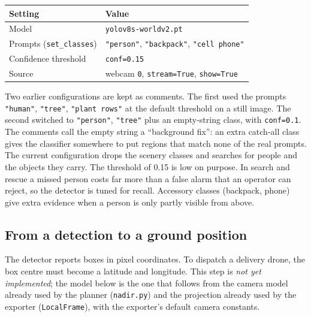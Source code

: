 \documentclass[11pt,a4paper]{article}
\newcommand{\code}[1]{\texttt{#1}}
\begin{document}
\begin{center}
\begin{tabular}{@{}ll@{}}
\toprule
Setting & Value \\
\midrule
Model & \code{yolov8s-worldv2.pt} \\
Prompts (\code{set\_classes}) & \code{"person"}, \code{"backpack"}, \code{"cell phone"} \\
Confidence threshold & \code{conf=0.15} \\
Source & webcam \code{0}, \code{stream=True}, \code{show=True} \\
\bottomrule
\end{tabular}
\end{center}

Two earlier configurations are kept as comments. The first used the prompts \code{"human"}, \code{"tree"},
\code{"plant rows"} at the default threshold on a still image. The second switched to \code{"person"},
\code{"tree"} plus an empty-string class, with \code{conf=0.1}. The comments call the empty string a
``background fix'': an extra catch-all class gives the classifier somewhere to put regions that match
none of the real prompts. The current configuration drops the scenery classes and searches for people and
the objects they carry. The threshold of 0.15 is low on purpose. In search and
rescue a missed person costs far more than a false alarm that an operator can reject, so the detector is
tuned for recall. Accessory classes (backpack, phone) give extra evidence when a person is only partly
visible from above.

\subsection{From a detection to a ground position}
\label{sec:geoloc}

The detector reports boxes in pixel coordinates. To dispatch a delivery drone, the box centre must become a
latitude and longitude. This step is \emph{not yet implemented}; the model below is the one that follows
from the camera model already used by the planner (\code{nadir.py}) and the projection already used by the
exporter (\code{LocalFrame}), with the exporter's default camera constants.
\end{document}
